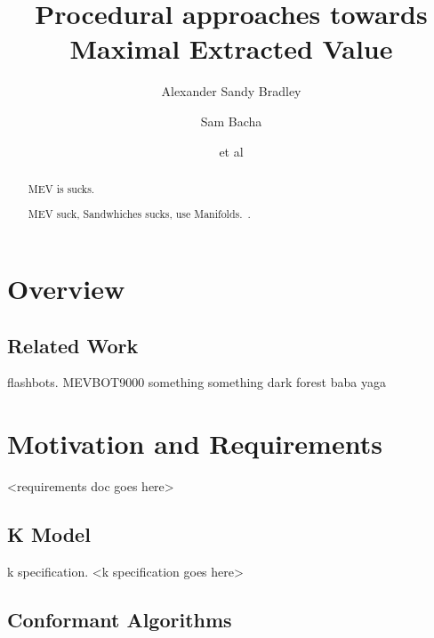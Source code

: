 \documentclass[runningheads]{llncs}
\begin{document}
%
\title{Procedural approaches towards Maximal Extracted Value}
%
\author{Alexander Sandy Bradley \and
	Sam Bacha \and
	et al}
%
%

%
\maketitle              %
%
\begin{abstract}
	MEV is sucks.

\end{abstract}
%
%
%
\section{Overview}
\begin{abstract}
	MEV suck, Sandwhiches sucks, use Manifolds.~\cite{openmev}.

\end{abstract}
\subsection{Related Work}

flashbots.
MEVBOT9000
something something dark forest
baba yaga

\section{Motivation and Requirements}

<requirements doc goes here>

\subsection{K Model}

k specification. <k specification goes here>

\subsection{Conformant Algorithms}
\end{document}
